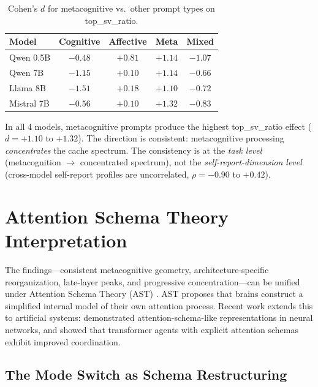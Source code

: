 \documentclass[11pt,a4paper]{article}
\begin{document}
\begin{table}[H]
\centering
\caption{Cohen's $d$ for metacognitive vs.\ other prompt types on top\_sv\_ratio.}
\label{tab:tsv_universal}
\begin{tabular}{lcccc}
\toprule
\textbf{Model} & \textbf{Cognitive} & \textbf{Affective} & \textbf{Meta} & \textbf{Mixed} \\
\midrule
Qwen 0.5B  & $-0.48$ & $+0.81$ & $+1.14$ & $-1.07$ \\
Qwen 7B    & $-1.15$ & $+0.10$ & $+1.14$ & $-0.66$ \\
Llama 8B   & $-1.51$ & $+0.18$ & $+1.10$ & $-0.72$ \\
Mistral 7B & $-0.56$ & $+0.10$ & $+1.32$ & $-0.83$ \\
\bottomrule
\end{tabular}
\end{table}

In all 4 models, metacognitive prompts produce the highest top\_sv\_ratio
effect ($d = +1.10$ to $+1.32$). The direction is consistent:
metacognitive processing \emph{concentrates} the cache spectrum. The
consistency is at the \emph{task level} (metacognition $\to$ concentrated
spectrum), not the \emph{self-report-dimension level} (cross-model
self-report profiles are uncorrelated, $\rho = -0.90$ to $+0.42$).

\section{Attention Schema Theory Interpretation}

The findings---consistent metacognitive geometry, architecture-specific
reorganization, late-layer peaks, and progressive concentration---can be unified under Attention Schema
Theory (AST) \citep{webb2015attention,graziano2017attention}. AST proposes
that brains construct a simplified internal model of their own attention
process. Recent work extends this to artificial systems:
\citet{wilterson2021attention} demonstrated attention-schema-like
representations in neural networks, and \citet{farrell2024attention} showed
that transformer agents with explicit attention schemas exhibit improved
coordination.

\subsection{The Mode Switch as Schema Restructuring}
\end{document}
